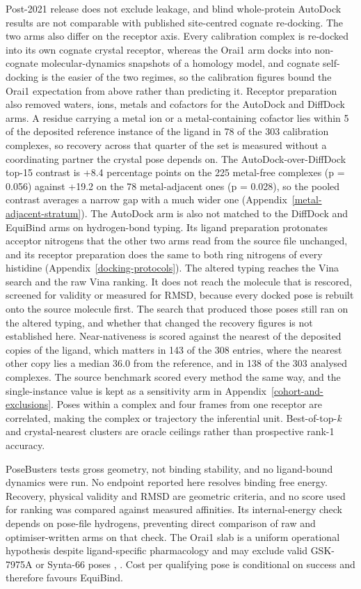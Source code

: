 Post-2021 release does not exclude leakage, and blind whole-protein AutoDock results are not comparable with published site-centred cognate re-docking. The two arms also differ on the receptor axis. Every calibration complex is re-docked into its own cognate crystal receptor, whereas the Orai1 arm docks into non-cognate molecular-dynamics snapshots of a homology model, and cognate self-docking is the easier of the two regimes, so the calibration figures bound the Orai1 expectation from above rather than predicting it. Receptor preparation also removed waters, ions, metals and cofactors for the AutoDock and DiffDock arms. A residue carrying a metal ion or a metal-containing cofactor lies within 5\angstrom{} of the deposited reference instance of the ligand in 78 of the 303 calibration complexes, so recovery across that quarter of the set is measured without a coordinating partner the crystal pose depends on. The AutoDock-over-DiffDock top-15 contrast is +8.4 percentage points on the 225 metal-free complexes (p = 0.056) against +19.2 on the 78 metal-adjacent ones (p = 0.028), so the pooled contrast averages a narrow gap with a much wider one (Appendix~\ref{metal-adjacent-stratum}). The AutoDock arm is also not matched to the DiffDock and EquiBind arms on hydrogen-bond typing. Its ligand preparation protonates acceptor nitrogens that the other two arms read from the source file unchanged, and its receptor preparation does the same to both ring nitrogens of every histidine (Appendix~\ref{docking-protocols}). The altered typing reaches the Vina search and the raw Vina ranking. It does not reach the molecule that is rescored, screened for validity or measured for RMSD, because every docked pose is rebuilt onto the source molecule first. The search that produced those poses still ran on the altered typing, and whether that changed the recovery figures is not established here. Near-nativeness is scored against the nearest of the deposited copies of the ligand, which matters in 143 of the 308 entries, where the nearest other copy lies a median 36.0\angstrom{} from the reference, and in 138 of the 303 analysed complexes. The source benchmark scored every method the same way, and the single-instance value is kept as a sensitivity arm in Appendix~\ref{cohort-and-exclusions}. Poses within a complex and four frames from one receptor are correlated, making the complex or trajectory the inferential unit. Best-of-top-\emph{k} and crystal-nearest clusters are oracle ceilings rather than prospective rank-1 accuracy.

PoseBusters tests gross geometry, not binding stability, and no ligand-bound dynamics were run. No endpoint reported here resolves binding free energy. Recovery, physical validity and RMSD are geometric criteria, and no score used for ranking was compared against measured affinities. Its internal-energy check depends on pose-file hydrogens, preventing direct comparison of raw and optimiser-written arms on that check. 
The Orai1 slab is a uniform operational hypothesis despite ligand-specific pharmacology and may exclude valid GSK-7975A or Synta-66 poses \cite{ref070}, \cite{ref071}. Cost per qualifying pose is conditional on success and therefore favours EquiBind.

